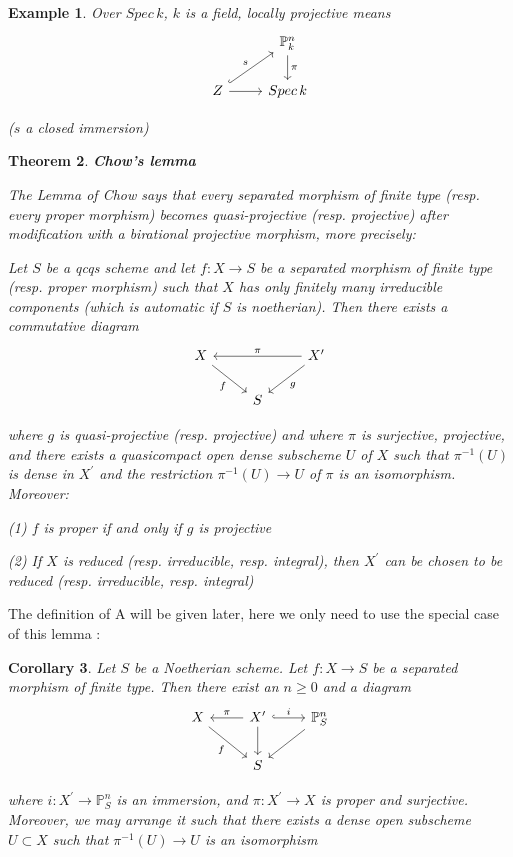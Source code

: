 \documentclass{article}
\newtheorem{theorem}{Theorem}[section]
\newtheorem{corollary}[theorem]{Corollary}
\newtheorem{example}[theorem]{Example}
\begin{document}
\begin{example}
    Over $Spec\,k$, $k$ is a field, locally projective means 
    \[\begin{tikzcd}
	& {\mathbb P^{n} _{k}} \\
	Z & {Spec\,k}
	\arrow[from=2-1, to=2-2]
	\arrow["s", hook, from=2-1, to=1-2]
	\arrow["\pi", from=1-2, to=2-2]
    \end{tikzcd}\]

    ($s$ a closed immersion)
\end{example}

\begin{theorem}
    \textbf{Chow's lemma}

The Lemma of Chow says that every separated morphism of finite type (resp. every
proper morphism) becomes quasi-projective (resp. projective) after modification with a
birational projective morphism, more precisely:

Let $S$ be a qcqs scheme and let $f : X \to S$ be a separated morphism of finite type (resp.
proper morphism) such that $X$ has only finitely many irreducible components (which is automatic
if $S$ is noetherian).
Then there exists a commutative diagram
\[\begin{tikzcd}
	X && {X^\prime} \\
	& S
	\arrow["f"', from=1-1, to=2-2]
	\arrow["g", from=1-3, to=2-2]
	\arrow["\pi"', from=1-3, to=1-1]
\end{tikzcd}\]

where $g$ is quasi-projective  (resp. projective) and where $\pi$ is surjective, projective, and there exists a quasicompact open dense subscheme $U$ of $X$ such that $\pi^{-1}(U)$ is dense in $X^\prime$ and the restriction $\pi^{-1}(U) \to U$ of $\pi$ is an isomorphism. Moreover:

(1) $f$ is proper if and only if $g$ is projective

(2) If $X$ is reduced (resp. irreducible, resp. integral), then $X^\prime$ can be chosen to be reduced
(resp. irreducible, resp. integral)
\end{theorem}

The definition of A will be given later, here we only need to use the special case of this lemma :

\begin{corollary}
Let $S$ be a Noetherian scheme. Let $f:X\to S$ be a separated morphism of finite type. Then there exist an $n\geq 0$ and a diagram
\[\begin{tikzcd}
	X & {X^\prime} & {\mathbb P_S^n} \\
	& S
	\arrow["f"', from=1-1, to=2-2]
	\arrow["\pi"', from=1-2, to=1-1]
	\arrow[from=1-2, to=2-2]
	\arrow["i", hook, from=1-2, to=1-3]
	\arrow[from=1-3, to=2-2]
\end{tikzcd}\]

where $i:X^\prime \to \mathbb P_S^n$ is an immersion, and $\pi:X^\prime\to X$ is proper and surjective. Moreover, we may arrange it such that there exists a dense open subscheme $U\subset X$ such that $\pi^{-1}(U)\to U$ is an isomorphism
\end{corollary}
\end{document}
